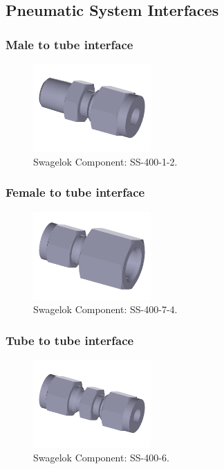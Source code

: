 \documentclass[a4paper,12pt,twoside]{article}
\begin{document}
\begin{appendices}
\newpage
\subsection{Pneumatic System Interfaces}
\label{sec:appP}

\subsubsection{Male to tube interface}

\begin{figure}[H]
    \centering
    \includegraphics[width=0.4\textwidth]{appendix/img/interfaces/SS-400-1-2-SwagelokCompany-07-10-2018.png}
    \caption{Swagelok Component: SS-400-1-2.}
    \label{fig:male_interface}
\end{figure}


\subsubsection{Female to tube interface}

\begin{figure}[H]
    \centering
    \includegraphics[width=0.4\textwidth]{appendix/img/interfaces/SS-400-7-4-SwagelokCompany-07-10-2018.png}
    \caption{Swagelok Component: SS-400-7-4.}
    \label{fig:FEmale_interface}
\end{figure}

\subsubsection{Tube to tube interface}

\begin{figure}[H]
    \centering
    \includegraphics[width=0.4\textwidth]{appendix/img/interfaces/SS-400-6-SwagelokCompany-07-10-2018.png}
    \caption{Swagelok Component: SS-400-6.}
    \label{fig:STRAIGHT_interface}
\end{figure}



\end{appendices}
\end{document}
